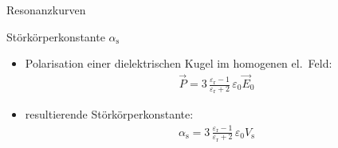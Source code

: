 \documentclass[12pt,xcolor=dvipsnames,professionalfonts]{beamer}
\newcommand{\backupend}{
	\addtocounter{framenumbervorappendix}{-\value{framenumber}}
	\addtocounter{framenumber}{\value{framenumbervorappendix}} 
}
\begin{document}
\begin{frame}{Resonanzkurven}
	\begin{small}
		\centering
		
	\end{small}
\end{frame}

\begin{frame}{Störkörperkonstante $\alpha_\mathrm{s}$}
	\begin{itemize}
		\item Polarisation einer dielektrischen Kugel im homogenen el.\ Feld:
		\begin{align*}
			  \vec{P} = 3 \, \frac{\varepsilon_\mathrm{r} - 1}{\varepsilon_\mathrm{r} + 2} \, \varepsilon_0 \vec{E}_0
		\end{align*}
		
		\item resultierende Störkörperkonstante:
		\begin{align*}
			\alpha_\mathrm{s} = 3 \, \frac{\varepsilon_\mathrm{r} - 1}{\varepsilon_\mathrm{r} + 2} \, \varepsilon_0 V_\mathrm{s}
		\end{align*}
	\end{itemize}
\end{frame}
\backupend
\end{document}
